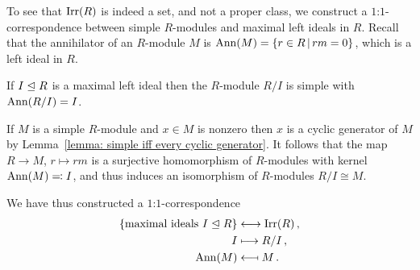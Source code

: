 

\begin{remark}
  To see that $\operatorname{Irr}(R)$ is indeed a set, and not a proper class, we construct a $1$:$1$-correspondence between simple $R$-modules and maximal left ideals in $R$.
  Recall that the annihilator of an $R$-module $M$ is $\Ann(M) = \{r \in R \suchthat rm = 0\}$, which is a left ideal in $R$.
  
  If $I \trianglelefteq R$ is a maximal left ideal then the $R$-module $R/I$ is simple with $\operatorname{Ann}(R/I) = I$.
  
  If $M$ is a simple $R$-module and $x \in M$ is nonzero then $x$ is a cyclic generator of $M$ by Lemma~\ref{lemma: simple iff every cyclic generator}.
  It follows that the map $R \to M$, $r \mapsto rm$ is a surjective homomorphism of $R$-modules with kernel $\operatorname{Ann}(M) \eqqcolon I$, and thus induces an isomorphism of $R$-modules $R/I \cong M$.
  
  We have thus constructed a $1$:$1$-correspondence
  \begin{align*}
    \{ \text{maximal ideals $I \trianglelefteq R$} \}
    &\longleftrightarrow
    \operatorname{Irr}(R) \,, 
    \\
    I
    &\longmapsto
    R/I \,,
    \\
    \operatorname{Ann}(M)
    &\longmapsfrom
    M \,.
  \end{align*}
\end{remark}
